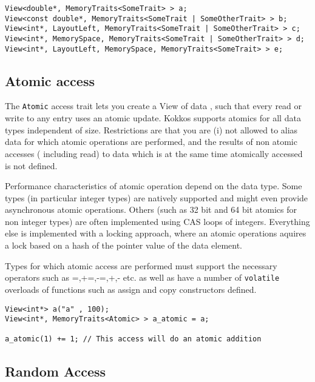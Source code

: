 \begin{lstlisting}
View<double*, MemoryTraits<SomeTrait> > a;
View<const double*, MemoryTraits<SomeTrait | SomeOtherTrait> > b;
View<int*, LayoutLeft, MemoryTraits<SomeTrait | SomeOtherTrait> > c;
View<int*, MemorySpace, MemoryTraits<SomeTrait | SomeOtherTrait> > d;
View<int*, LayoutLeft, MemorySpace, MemoryTraits<SomeTrait> > e;
\end{lstlisting}

\subsection{Atomic access}

The \lstinline!Atomic! access trait lets you create a View of data , such that every
read or write to any entry uses an atomic update. Kokkos supports atomics for 
all data types independent of size. Restrictions are that you are (i) not allowed to alias data
for which atomic operations are performed, and the results of non atomic accesses (
including read) to data which is at the same time atomically accessed is not defined. 

Performance characteristics of atomic operation depend on the data type. 
Some types (in particular integer types) are natively supported and might even provide 
asynchronous atomic operations. Others (such as 32 bit and 64 bit atomics for non 
integer types) are often implemented using CAS loops of integers. 
Everything else is implemented with a locking approach, where an atomic operations 
aquires a lock based on a hash of the pointer value of the data element.  

Types for which atomic access are performed must support the 
necessary operators such as =,+=,-=,+,- etc. as well as have a number of \lstinline|volatile|
overloads of functions such as assign and copy constructors defined. 

\begin{lstlisting}
View<int*> a("a" , 100);
View<int*, MemoryTraits<Atomic> > a_atomic = a;

a_atomic(1) += 1; // This access will do an atomic addition
\end{lstlisting} 

\subsection{Random Access}

